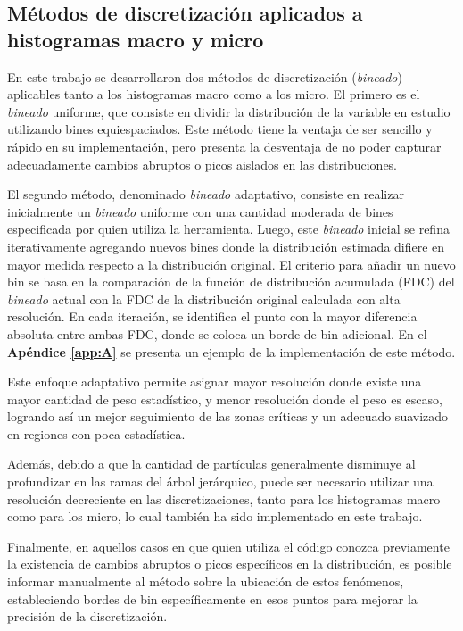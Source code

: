 \subsection{Métodos de discretización aplicados a histogramas macro y micro}
En este trabajo se desarrollaron dos métodos de discretización (\textit{bineado}) aplicables tanto a los histogramas macro como a los micro. El primero es el \textit{bineado} uniforme, que consiste en dividir la distribución de la variable en estudio utilizando bines equiespaciados. Este método tiene la ventaja de ser sencillo y rápido en su implementación, pero presenta la desventaja de no poder capturar adecuadamente cambios abruptos o picos aislados en las distribuciones.

El segundo método, denominado \textit{bineado} adaptativo, consiste en realizar inicialmente un \textit{bineado} uniforme con una cantidad moderada de bines especificada por quien utiliza la herramienta. Luego, este \textit{bineado} inicial se refina iterativamente agregando nuevos bines donde la distribución estimada difiere en mayor medida respecto a la distribución original. El criterio para añadir un nuevo bin se basa en la comparación de la función de distribución acumulada (FDC) del \textit{bineado} actual con la FDC de la distribución original calculada con alta resolución. En cada iteración, se identifica el punto con la mayor diferencia absoluta entre ambas FDC, donde se coloca un borde de bin adicional. En el \textbf{Apéndice \ref{app:A}} se presenta un ejemplo de la implementación de este método.

Este enfoque adaptativo permite asignar mayor resolución donde existe una mayor cantidad de peso estadístico, y menor resolución donde el peso es escaso, logrando así un mejor seguimiento de las zonas críticas y un adecuado suavizado en regiones con poca estadística.

Además, debido a que la cantidad de partículas generalmente disminuye al profundizar en las ramas del árbol jerárquico, puede ser necesario utilizar una resolución decreciente en las discretizaciones, tanto para los histogramas macro como para los micro, lo cual también ha sido implementado en este trabajo.

Finalmente, en aquellos casos en que quien utiliza el código conozca previamente la existencia de cambios abruptos o picos específicos en la distribución, es posible informar manualmente al método sobre la ubicación de estos fenómenos, estableciendo bordes de bin específicamente en esos puntos para mejorar la precisión de la discretización.


